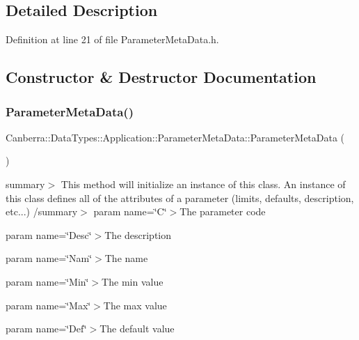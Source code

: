 \subsection{Detailed Description}


Definition at line 21 of file Parameter\+Meta\+Data.\+h.



\subsection{Constructor \& Destructor Documentation}
\mbox{\label{class_canberra_1_1_data_types_1_1_application_1_1_parameter_meta_data_a164df16301f3fc5bd14ca63476d7ed63_a164df16301f3fc5bd14ca63476d7ed63}} 
\subsubsection{\texorpdfstring{Parameter\+Meta\+Data()}{ParameterMetaData()}\hspace{0.1cm}{\footnotesize\ttfamily [1/2]}}
{\footnotesize\ttfamily Canberra\+::\+Data\+Types\+::\+Application\+::\+Parameter\+Meta\+Data\+::\+Parameter\+Meta\+Data (\begin{DoxyParamCaption}{ }\end{DoxyParamCaption})}

summary$>$ This method will initialize an instance of this class. An instance of this class defines all of the attributes of a parameter (limits, defaults, description, etc...) /summary$>$ param name=\char`\"{}\+C\char`\"{}$>$The parameter code

param name=\char`\"{}\+Desc\char`\"{}$>$The description

param name=\char`\"{}\+Nam\char`\"{}$>$The name

param name=\char`\"{}\+Min\char`\"{}$>$The min value

param name=\char`\"{}\+Max\char`\"{}$>$The max value

param name=\char`\"{}\+Def\char`\"{}$>$The default value

